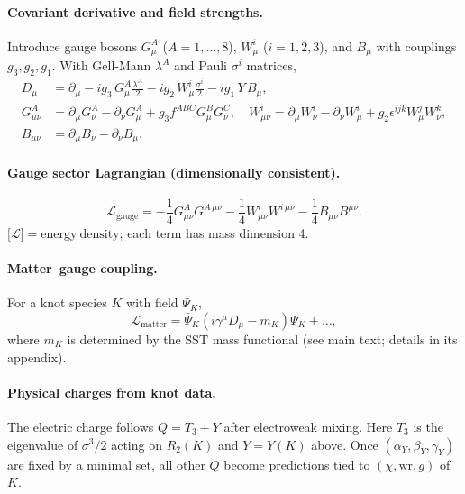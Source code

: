 \documentclass[10pt,reprint,aps,onecolumn,nofootinbib]{revtex4-2}
\begin{document}
    \paragraph{Covariant derivative and field strengths.}
        Introduce gauge bosons
        $G_\mu^A$ ($A=1,\dots,8$), $W_\mu^i$ ($i=1,2,3$), and $B_\mu$ with couplings $g_3,g_2,g_1$.
        With Gell-Mann $\lambda^A$ and Pauli $\sigma^i$ matrices,
        \begin{align}
        D_\mu &= \partial_\mu
        - i g_3\, G_\mu^A \frac{\lambda^A}{2}
        - i g_2\, W_\mu^i \frac{\sigma^i}{2}
        - i g_1\, Y\, B_\mu, \label{eq:covD}\\[2mm]
        G_{\mu\nu}^A &= \partial_\mu G_\nu^A - \partial_\nu G_\mu^A
        + g_3 f^{ABC} G_\mu^B G_\nu^C,\quad
        W_{\mu\nu}^i = \partial_\mu W_\nu^i - \partial_\nu W_\mu^i
        + g_2 \epsilon^{ijk} W_\mu^j W_\nu^k, \nonumber\\
        B_{\mu\nu} &= \partial_\mu B_\nu - \partial_\nu B_\mu. \label{eq:YMstrengths}
        \end{align}

    \paragraph{Gauge sector Lagrangian (dimensionally consistent).}
        \begin{equation}
        \mathcal{L}_{\text{gauge}}
        = -\frac{1}{4} G_{\mu\nu}^A G^{A\,\mu\nu}
        -\frac{1}{4} W_{\mu\nu}^i W^{i\,\mu\nu}
        -\frac{1}{4} B_{\mu\nu} B^{\mu\nu}.
        \label{eq:YMlag}
        \end{equation}
        $\big[\mathcal{L}\big]=\mathrm{energy~density}$; each term has mass dimension 4.

    \paragraph{Matter–gauge coupling.}
        For a knot species $K$ with field $\Psi_K$,
        \begin{equation}
        \mathcal{L}_{\text{matter}} = \bar{\Psi}_K(i\gamma^\mu D_\mu - m_K)\Psi_K + \ldots,
        \label{eq:matter}
        \end{equation}
        where $m_K$ is determined by the SST mass functional (see main text; details in its appendix).

    \paragraph{Physical charges from knot data.}
        The electric charge follows $Q = T_3 + Y$ after electroweak mixing.
        Here $T_3$ is the eigenvalue of $\sigma^3/2$ acting on $R_2(K)$ and
        $Y=Y(K)$ above. Once $(\alpha_Y,\beta_Y,\gamma_Y)$ are fixed by a minimal set,
        all other $Q$ become predictions tied to $(\chi,\mathrm{wr},g)$ of $K$.
\end{document}
